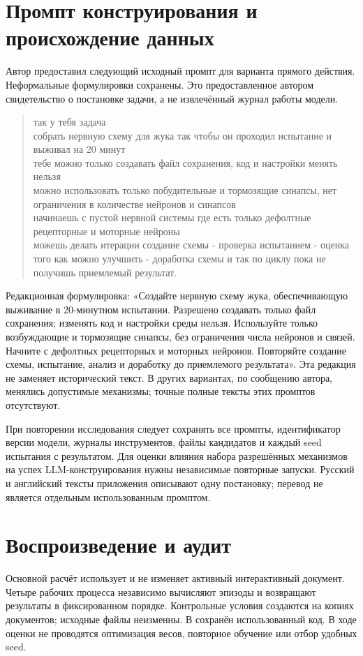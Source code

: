 \documentclass[11pt]{article}
\begin{document}
\section{Промпт конструирования и происхождение данных}
Автор предоставил следующий исходный промпт для варианта прямого действия. Неформальные формулировки сохранены. Это предоставленное автором свидетельство о постановке задачи, а не извлечённый журнал работы модели.
\begin{quote}\small
так у тебя задача\\
собрать нервную схему для жука так чтобы он проходил испытание и выживал на 20 минут\\
тебе можно только создавать файл сохранения, код и настройки менять нельзя\\
можно использовать только побудительные и тормозящие синапсы, нет ограничения в количестве нейронов и синапсов\\
начинаешь с пустой нервной системы где есть только дефолтные рецепторные и моторные нейроны\\
можешь делать итерации создание схемы - проверка испытанием - оценка того как можно улучшить - доработка схемы и так по циклу пока не получишь приемлемый результат.
\end{quote}
Редакционная формулировка: «Создайте нервную схему жука, обеспечивающую выживание в 20-минутном испытании. Разрешено создавать только файл сохранения; изменять код и настройки среды нельзя. Используйте только возбуждающие и тормозящие синапсы, без ограничения числа нейронов и связей. Начните с дефолтных рецепторных и моторных нейронов. Повторяйте создание схемы, испытание, анализ и доработку до приемлемого результата». Эта редакция не заменяет исторический текст. В других вариантах, по сообщению автора, менялись допустимые механизмы; точные полные тексты этих промптов отсутствуют.

При повторении исследования следует сохранять все промпты, идентификатор версии модели, журналы инструментов, файлы кандидатов и каждый seed испытания с результатом. Для оценки влияния набора разрешённых механизмов на успех LLM-конструирования нужны независимые повторные запуски. Русский и английский тексты приложения описывают одну постановку; перевод не является отдельным использованным промптом.

\section{Воспроизведение и аудит}
Основной расчёт использует  и не изменяет активный интерактивный документ. Четыре рабочих процесса независимо вычисляют эпизоды и возвращают результаты в фиксированном порядке. Контрольные условия создаются на копиях документов; исходные файлы неизменны. В  сохранён использованный код. В ходе оценки не проводятся оптимизация весов, повторное обучение или отбор удобных seed.
\end{document}
